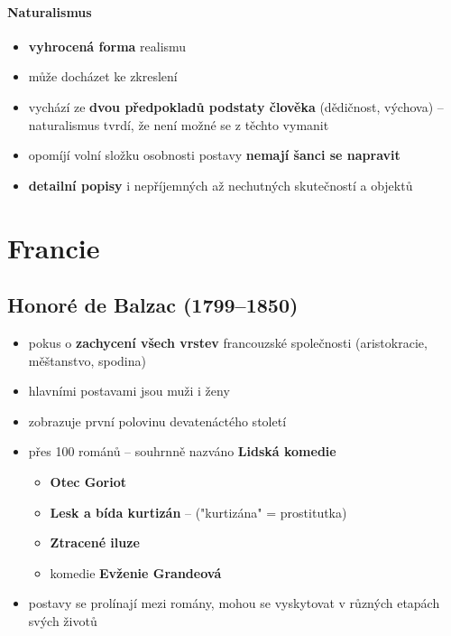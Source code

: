 \paragraph{Naturalismus}
\begin{itemize}
\item \textbf{vyhrocená forma} realismu
\item může docházet ke zkreslení
\item vychází ze \textbf{dvou předpokladů podstaty člověka} (dědičnost, výchova) -- naturalismus tvrdí, že není možné se z těchto vymanit
\item opomíjí volní složku osobnosti \ra postavy \textbf{nemají šanci se napravit}
\item \textbf{detailní popisy }i nepříjemných až nechutných skutečností a objektů
\end{itemize}


\section{Francie}
\subsection{Honoré de Balzac (1799--1850)}
\begin{itemize}
\item pokus o \textbf{zachycení všech vrstev} francouzské společnosti (aristokracie, měštanstvo, spodina)
\item hlavními postavami jsou muži i ženy
\item zobrazuje první polovinu devatenáctého století
\item přes 100 románů -- souhrnně nazváno \textbf{Lidská komedie}
	\begin{itemize}
	\item \textbf{Otec Goriot}
	\item \textbf{Lesk a bída kurtizán} -- ("kurtizána" = prostitutka)
	\item \textbf{Ztracené iluze}
	\item komedie \textbf{Evženie Grandeová}
	\end{itemize}
\item postavy se prolínají mezi romány, mohou se vyskytovat v různých etapách svých životů
\end{itemize}

